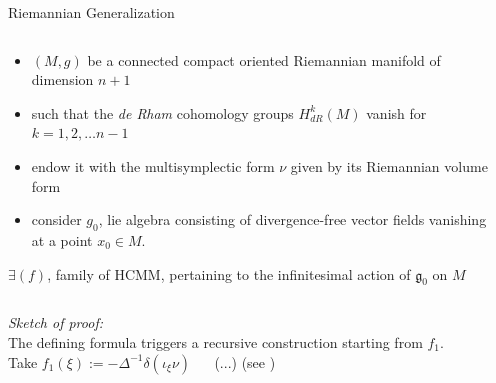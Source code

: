 \documentclass[handout,10pt]{beamer}
\begin{document}
  \begin{frame}[shrink]{Riemannian Generalization}\label{frame:RiemannianGeneralization}
			\begin{columns}
				\begin{column}{.5\linewidth}
					\begin{itemize}
						\item  $(M,g)$ be a connected compact oriented Riemannian manifold of dimension $n+1$
						\item such that the {\it de Rham} cohomology groups $H_{dR}^{k}(M)$ vanish for $k=1,2,\dots n-1$ 
						\item endow it with the multisymplectic form $\nu$ given by its Riemannian volume form
						\item consider $g_0$, lie algebra consisting of divergence-free vector fields vanishing at a point $x_0 \in M$.
					\end{itemize}
					\begin{claimblock}
						$\exists (f)$, family of HCMM, pertaining to the infinitesimal action of $\mathfrak{g}_0$ on $M$
					\end{claimblock}
				\end{column}
				\begin{column}{.5\linewidth}
 			 		
				\end{column}
			\end{columns}
		\textit{Sketch of proof:}\\
			The defining formula triggers a recursive construction starting from $f_1$.\\
			Take $ f_1(\xi) := -\Delta^{-1} \delta (\iota_{\xi} \nu)$
			$\quad$ (...) (see \cite{Miti2018})
  \end{frame}
\end{document}
